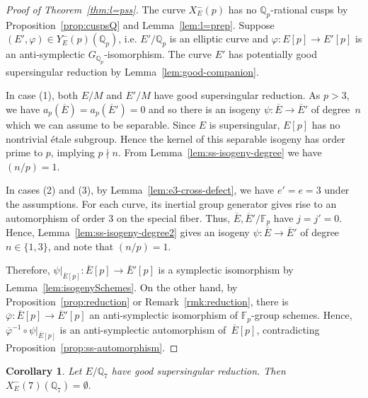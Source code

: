 \documentclass[12pt]{amsart}
\numberwithin{equation}{section}
\newtheorem{corollary}[equation]{Corollary}
\theoremstyle{definition}
\newcommand{\F}{\mathbb{F}}
\newcommand{\Q}{\mathbb{Q}}
\newcommand{\Ebar}{{\overline{E}}}
\begin{document}
\begin{proof}[Proof of Theorem~\ref{thm:l=pss}]
The curve $X_E^-(p)$ has no $\Q_p$-rational cusps by Proposition~\ref{prop:cuspsQ} and
Lemma~\ref{lem:l=prep}. Suppose $(E',\varphi)\in Y_E^-(p)(\Q_p)$, i.e. $E'/\Q_p$ is an elliptic curve and $\varphi:E[p] \to E'[p]$ is an anti-symplectic $G_{\Q_p}$-isomorphism. 
The curve $E'$ has potentially good supersingular reduction by Lemma~\ref{lem:good-companion}.

In case (1), both $E/M$ and $E'/M$ have good supersingular reduction. 
As $p > 3$, we have $a_p(\Ebar) = a_p({\Ebar'})=0$ and so there is an isogeny 
$\psi : \Ebar \to \Ebar'$ of degree~$n$ which we can assume to be separable. Since $E$ is supersingular, $E[p]$ has no nontrivial \'etale subgroup.
Hence the kernel of this separable isogeny has order prime to $p$, 
implying $p \nmid n$. 
From Lemma~\ref{lem:ss-isogeny-degree} we have $(n/p)=1$. 

In cases (2) and (3), by Lemma~\ref{lem:e3-cross-defect}, we have $e'=e=3$ under the assumptions. 
For each curve, its inertial group generator gives rise to an automorphism of order $3$ on the special fiber.  Thus, $\overline{E}, \overline{E}'/\F_p$ have $j=j'=0$.
Hence, Lemma~\ref{lem:ss-isogeny-degree2} gives an isogeny $\psi : \Ebar \to \Ebar'$ of degree~$n \in \{1,3\}$, and note that $(n/p)=1$.

Therefore, $\psi|_{\Ebar[p]} : \Ebar[p] \to \Ebar'[p]$ is a symplectic isomorphism by Lemma~\ref{lem:isogenySchemes}.
On the other hand, by Proposition~\ref{prop:reduction} or Remark~\ref{rmk:reduction}, there 
is $\overline{\varphi} : \Ebar[p] \to \Ebar'[p]$
an anti-symplectic isomorphism  of $\F_p$-group schemes. 
 Hence, $\overline{\varphi}^{-1} \circ \psi|_{\Ebar[p]}$  is an anti-symplectic automorphism of~$\Ebar[p]$, contradicting Proposition~\ref{prop:ss-automorphism}.
\end{proof}

\begin{corollary}\label{cor:p7-good-ss}
Let $E/\Q_7$ have good supersingular reduction. Then
\(
 X_E^-(7)(\Q_7)=\emptyset.
\)
\end{corollary}
\end{document}
